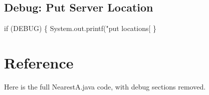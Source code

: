 \subsection{Debug: Put Server Location}

\nwenddocs{}\endmoddef\nwstartdeflinemarkup{}\nwenddeflinemarkup
if (DEBUG) \{
  System.out.printf("put locations[%
\}
\nwendcode{}\nwdocspar

\section{Reference}

Here is the full NearestA.java code, with debug sections removed.

